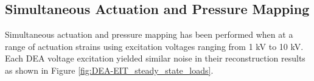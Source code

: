 
\subsection{Simultaneous Actuation and Pressure Mapping}
Simultaneous actuation and pressure mapping has been performed when at a range of actuation strains using excitation voltages ranging from 1 kV to 10 kV. Each DEA voltage excitation yielded similar noise in their reconstruction results as shown in Figure \ref{fig:DEA-EIT_steady_state_loads}.

